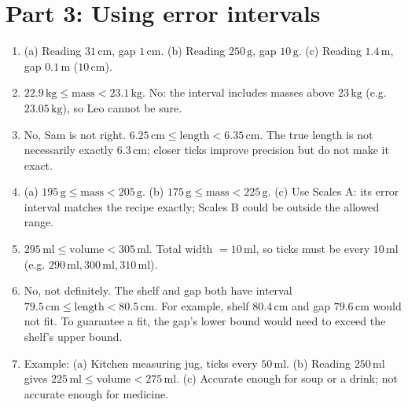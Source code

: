 \documentclass[11pt,a4paper]{article}
\begin{document}
\section*{Part 3: Using error intervals}
\begin{enumerate}[label=\textbf{Q\arabic*.}, start=13, leftmargin=*, itemsep=2pt]
\item (a) Reading \(31\,\text{cm}\), gap \(1\,\text{cm}\). (b) Reading \(250\,\text{g}\), gap \(10\,\text{g}\). (c) Reading \(1.4\,\text{m}\), gap \(0.1\,\text{m}\) (\(10\,\text{cm}\)).
\item \(22.9\,\text{kg}\le \text{mass}<23.1\,\text{kg}\). No: the interval includes masses above \(23\,\text{kg}\) (e.g. \(23.05\,\text{kg}\)), so Leo cannot be sure.
\item No, Sam is not right. \(6.25\,\text{cm}\le \text{length}<6.35\,\text{cm}\). The true length is not necessarily exactly \(6.3\,\text{cm}\); closer ticks improve precision but do not make it exact.
\item (a) \(195\,\text{g}\le \text{mass}<205\,\text{g}\). (b) \(175\,\text{g}\le \text{mass}<225\,\text{g}\). (c) Use Scales A: its error interval matches the recipe exactly; Scales B could be outside the allowed range.
\item \(295\,\text{ml}\le \text{volume}<305\,\text{ml}\). Total width \(=10\,\text{ml}\), so ticks must be every \(10\,\text{ml}\) (e.g. \(290\,\text{ml},300\,\text{ml},310\,\text{ml}\)).
\item No, not definitely. The shelf and gap both have interval \(79.5\,\text{cm}\le \text{length}<80.5\,\text{cm}\). For example, shelf \(80.4\,\text{cm}\) and gap \(79.6\,\text{cm}\) would not fit. To guarantee a fit, the gap's lower bound would need to exceed the shelf's upper bound.
\item Example: (a) Kitchen measuring jug, ticks every \(50\,\text{ml}\). (b) Reading \(250\,\text{ml}\) gives \(225\,\text{ml}\le \text{volume}<275\,\text{ml}\). (c) Accurate enough for soup or a drink; not accurate enough for medicine.
\end{enumerate}
\end{document}

